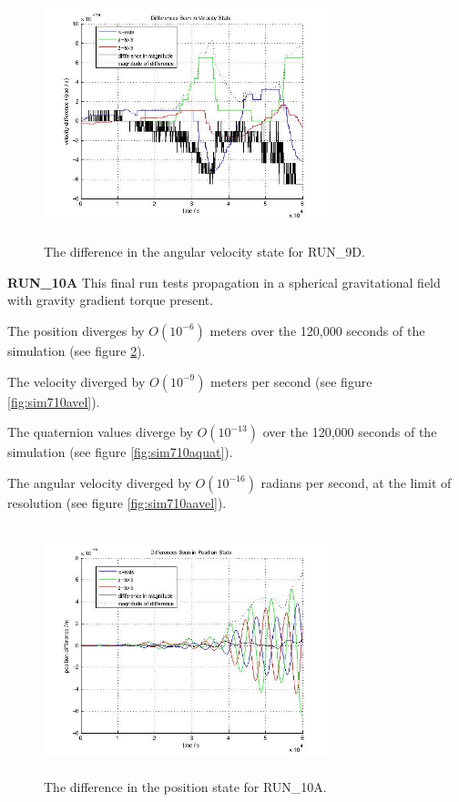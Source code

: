\begin{description}
\begin{figure}[htp]
\begin{center}
\includegraphics[width=3.2736in,height=2.85in]{figures/run_9davel.jpg}
\caption{The difference in the angular velocity state for RUN\_9D.}
\label{fig:sim79davel}
\end{center}
\end{figure}


\clearpage
{\bf RUN\_10A}
This final run tests propagation in a spherical gravitational field with 
gravity gradient torque present.

The position diverges by $O(10^{-6})$ meters over the 120,000 seconds of the 
simulation (see figure \ref{fig:sim710apos}).

The velocity diverged by $O(10^{-9})$ meters per second (see figure 
\ref{fig:sim710avel}).

The quaternion values diverge by $O(10^{-13})$ over the 120,000 seconds of the 
simulation (see figure \ref{fig:sim710aquat}).

The angular velocity diverged by $O(10^{-16})$ radians per second, at the limit 
of resolution (see figure \ref{fig:sim710aavel}).


\begin{figure}[htp]
\begin{center}
\includegraphics[width=3.2736in,height=2.85in]{figures/run_10apos.jpg}
\caption{The difference in the position state for RUN\_10A.}
\label{fig:sim710apos}
\end{center}
\end{figure}


\end{description}
